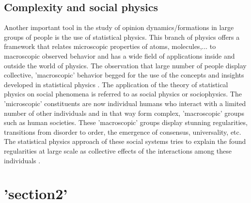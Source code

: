 \documentclass[11 pt , letterpaper , twoside , openright]{book}
\begin{document}


\section{Complexity and social physics}

Another important tool in the study of opinion dynamics/formations in large groups of people is the use of statistical physics. This branch of physics offers a framework that relates microscopic properties of atoms, molecules,... to macroscopic observed behavior and has a wide field of applications inside and outside the world of physics. The observation that large number of people display collective, 'macroscopic' behavior begged for the use of the concepts and insights developed in statistical physics \cite{Sirbu2016}. The application of the theory of statistical physics on social phenomena is referred to as social physics or sociophysics. The 'microscopic' constituents are now individual humans who interact with a limited number of other individuals and in that way form complex, 'macroscopic' groups such as human societies. These 'macroscopic' groups display stunning regularities, transitions from disorder to order, the emergence of consensus, universality, etc. The statistical physics approach of these social systems tries to explain the found regularities at large scale as collective effects of the interactions among these individuals \cite{Sirbu2016}.


\chapter{'section2'}
\label{sec2}



\newpage

\end{document}
